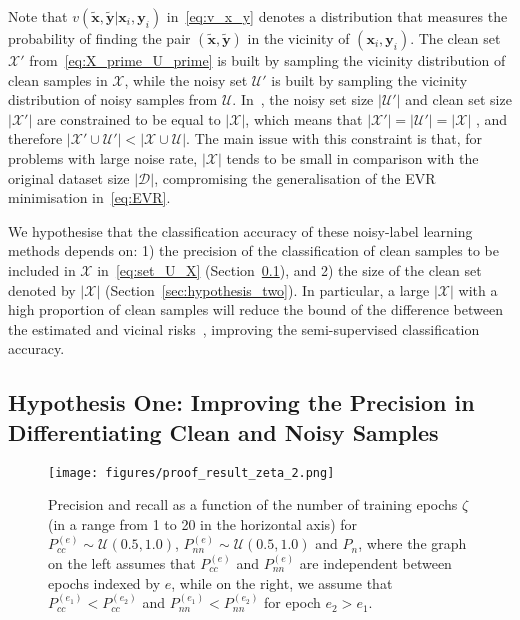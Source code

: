 \documentclass[review]{elsarticle}
\begin{document}
Note that $v(\tilde{\mathbf{x}},\tilde{\mathbf{y}}|\mathbf{x}_i,\mathbf{y}_i)$ in~\eqref{eq:v_x_y} denotes a distribution that measures the probability of finding the pair $(\tilde{\mathbf{x}},\tilde{\mathbf{y}})$ in the vicinity of $(\mathbf{x}_i,\mathbf{y}_i)$.
The clean set $\mathcal{X}'$ from~\eqref{eq:X_prime_U_prime} is built by sampling the vicinity distribution of clean samples in $\mathcal{X}$, while the noisy set $\mathcal{U}'$ is built by sampling the vicinity distribution of noisy samples from $\mathcal{U}$.
In~\cite{li2020dividemix},  the noisy set size $|\mathcal{U}'|$ and clean set size $|\mathcal{X}'|$ are constrained to be equal to 
$|\mathcal{X}|$, which means that  $|\mathcal{X}'|=|\mathcal{U}'|=|\mathcal{X}|$ , and therefore $|\mathcal{X}'\cup \mathcal{U}'|< |\mathcal{X} \cup \mathcal{U}| $.
The main issue with this constraint is that, for problems with large noise rate, $|\mathcal{X}|$ tends to be small in comparison with the original dataset size $|\mathcal{D}|$, compromising the generalisation of the EVR minimisation in~\eqref{eq:EVR}.



We hypothesise that the classification accuracy of these noisy-label learning methods depends on: 1) the precision of the classification of clean samples to be included in $\mathcal{X}$ in~\eqref{eq:set_U_X} (Section~\ref{sec:hypothesis_one}), and 2) the size of the clean set denoted by $|\mathcal{X}|$ (Section~\ref{sec:hypothesis_two}). 
In particular, a large $|\mathcal{X}|$ with a high proportion of clean samples  will reduce the bound of the difference between the estimated and vicinal risks~\cite{zhang2018generalization}, improving the semi-supervised classification accuracy.  


\subsection{Hypothesis One: Improving the Precision in Differentiating Clean and Noisy Samples}
\label{sec:hypothesis_one}

\begin{figure}[h!]
\centering
\texttt{[image: figures/proof\_result\_zeta\_2.png]}
\caption{Precision and recall as a function of the number of training epochs $\zeta$ (in a range from 1 to 20 in the horizontal axis) for $P^{(e)}_{cc} \sim \mathcal{U}(0.5,1.0)$, $P^{(e)}_{nn} \sim \mathcal{U}(0.5,1.0)$ and $P_n$, where the graph on the left assumes that $P^{(e)}_{cc}$ and $P^{(e)}_{nn}$ are independent between epochs indexed by $e$, while on the right, we assume that $P^{(e_1)}_{cc} < P^{(e_2)}_{cc}$ and $P^{(e_1)}_{nn} < P^{(e_2)}_{nn}$ for epoch $e_2 > e_1$.}
\label{fig:motivation_proof}
\end{figure}
\end{document}
